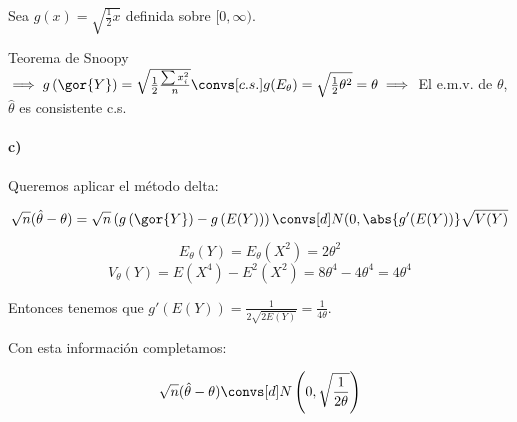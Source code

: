 \begin{problem}[5]
Sea $g(x) = \sqrt{\frac{1}{2}x}$ definida sobre $[0,\infty)$.

Teorema de Snoopy $\implies g\left(\gor{Y}\right) = \sqrt{\frac{1}{2} \frac{\sum x_i^2}{n}} \convs[c.s.] g(E_{\theta}) = \sqrt{\frac{1}{2}\theta^2} = \theta \implies $ El e.m.v. de $\theta$, $\hat{\theta}$ es consistente c.s.


\paragraph{c)}

Queremos aplicar el método delta:

\[\sqrt{n}(\hat{\theta} - \theta) = \sqrt{n}\left(g\left(\gor{Y}\right) - g\left(E(Y)\right)\right) \convs[d]N(0,\abs{g'(E(Y))}\sqrt{V(Y)}\]

\[E_{\theta}(Y) = E_{\theta} (X^2) = 2\theta^2\]
\[V_{\theta}(Y) = E(X^4) - E^2(X^2) = 8\theta^4-4\theta^4 = 4\theta^4\]

Entonces tenemos que $g'(E(Y)) = \displaystyle \frac{1}{2\sqrt{2E(Y)}} = \frac{1}{4\theta}$.

Con esta información completamos:  

\[\sqrt{n}(\hat{\theta} - \theta) \convs[d] N\left(0,\sqrt{\frac{1}{2\theta}}\right)\]

\end{problem}

